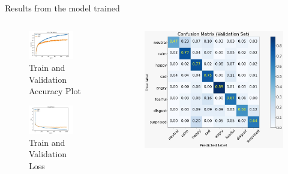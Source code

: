 \documentclass[10pt]{beamer}
\begin{document}
\begin{frame}{Results from the model trained}
\begin{columns}
	\begin{column}{0.5\textwidth}
	\begin{figure}
		\centering
		\includegraphics[width = 0.8\textwidth]{images/graph.jpeg}
		\caption{Train and Validation Accuracy Plot}
	\end{figure}
	\begin{figure}
		\centering
		\includegraphics[width = 0.8\textwidth]{images/graph2.jpeg}
		\caption{Train and Validation Loss}
	\end{figure}
	\end{column}
	\begin{column}{0.5\textwidth}
	\begin{figure}
		\centering
		\includegraphics[width = \textwidth]{images/cm.jpeg}

\end{figure}
\end{column}
\end{columns}
\end{frame}
\end{document}
